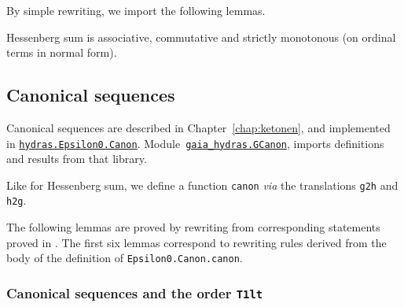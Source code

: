 \vspace{4pt} 
\noindent




By simple rewriting, we import the following lemmas.





Hessenberg sum is associative, commutative and strictly monotonous (on ordinal terms in normal form).


\subsection{Canonical sequences}
\label{sect:gcanon}

Canonical sequences are described in Chapter~\vref{chap:ketonen}, and implemented in
\href{../theories/html/hydras.Epsilon0.Canon.html}%
{\texttt{hydras.Epsilon0.Canon}}.
Module~\href{../theories/html/gaia_hydras.GCanon.html}%
{\texttt{gaia\_hydras.GCanon}}, imports definitions and results from that library.


Like for Hessenberg sum, we define a function \texttt{canon}
\emph{via} the
translations \texttt{g2h} and \texttt{h2g}.


The following lemmas are proved by rewriting from corresponding statements proved in \HydrasLib. The first six lemmas correspond to rewriting rules derived from the body of the definition of \texttt{Epsilon0.Canon.canon}.





\subsubsection{Canonical sequences and the order \texttt{T1lt}}

